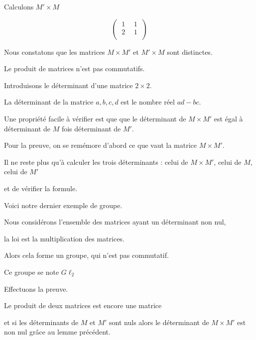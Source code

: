 \change

Calculons $M' \times M$

$$\left(\begin{matrix} \ 1\  & \ 1\  \\ \ 2\  & \ 1\  \\ \end{matrix}\right) $$

\change

Nous constatons que les matrices $M \times M'$ et $M' \times M$
sont distinctes. 

\change

Le produit de matrices n'est pas commutatifs.



\diapo

Introduisons le déterminant d'une matrice $2\times2$.

La déterminant de la matrice $a,b,c,d$ est le nombre réel $ad-bc$.

\change

Une propriété facile à vérifier est que que le déterminant de $M \times M'$
est égal à déterminant de $M$ fois déterminant de $M'$.

\change

Pour la preuve, on se remémore d'abord ce que vaut la matrice $M\times M'$.

\change

Il ne reste plus qu'à calculer les trois déterminants : celui de 
$M\times M'$, celui de $M$, celui de $M'$ 

et de vérifier la formule.


\diapo

Voici notre dernier exemple de groupe.

Nous considérons l'ensemble des matrices ayant un déterminant non nul, 

la loi est la multiplication des matrices.

Alors cela forme un groupe, qui n'est pas commutatif.

\change

Ce groupe se note $G\ell_2$

\change

Effectuons la preuve.

Le produit de deux matrices est encore une matrice

et si les déterminants de $M$ et $M'$ sont nuls alors
le déterminant de $M\times M'$ est non nul grâce au lemme précédent.

